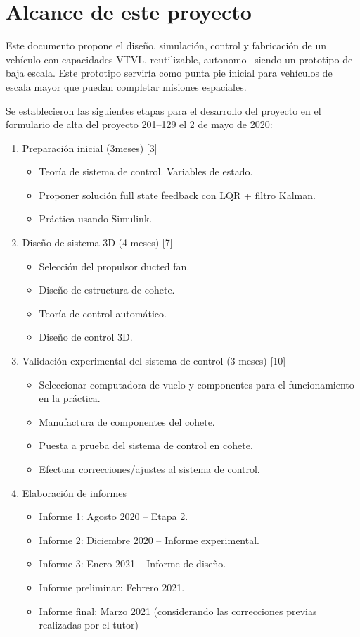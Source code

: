 \null\newpage
\clearpage

\section{Alcance de este proyecto}
Este documento propone el diseño, simulación, control y fabricación de un vehículo con capacidades VTVL, reutilizable, autonomo-- siendo un prototipo de baja escala. Este prototipo serviría como punta pie inicial para vehículos de escala mayor que puedan completar misiones espaciales. 

Se establecieron las siguientes etapas para el desarrollo del proyecto en el formulario de alta del proyecto 201--129 el 2 de mayo de 2020:
\begin{enumerate}
    \item Preparación inicial (3meses) [3]
    \begin{itemize}
        \item Teoría de sistema de control. Variables de estado.
        \item Proponer solución full state feedback con LQR + filtro Kalman.
        \item Práctica usando Simulink.
    \end{itemize}
    \item Diseño de sistema 3D (4 meses) [7]
    \begin{itemize}
        \item Selección del propulsor ducted fan.
        \item Diseño de estructura de cohete.
        \item Teoría de control automático.
        \item Diseño de control 3D.
    \end{itemize}
    \item Validación experimental del sistema de control (3 meses) [10]
    \begin{itemize}
        \item Seleccionar computadora de vuelo y componentes para el funcionamiento en la práctica.
        \item Manufactura de componentes del cohete.
        \item Puesta a prueba del sistema de control en cohete.
        \item Efectuar correcciones/ajustes al sistema de control.
    \end{itemize}
    \item Elaboración de informes
    \begin{itemize}
        \item Informe 1: Agosto 2020 -- Etapa 2.
        \item Informe 2: Diciembre 2020 -- Informe experimental.
        \item Informe 3: Enero 2021 -- Informe de diseño.
        \item Informe preliminar: Febrero 2021.
        \item Informe final: Marzo 2021 (considerando las correcciones previas realizadas por el tutor)
    \end{itemize}
\end{enumerate}

